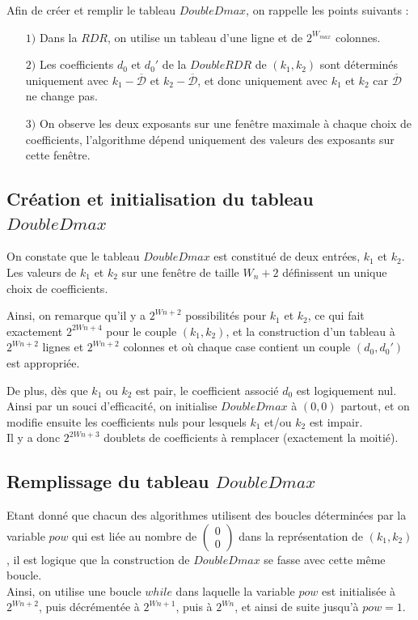 \documentclass[12pt, a4paper]{memoir}
\newcommand{\doublezero}{\begin{pmatrix} 0 \\ 0 \end{pmatrix}}
\newcommand{\dbarre}{\overline{\mathcal{D}}}
\begin{document}
      Afin de créer et remplir le tableau $DoubleDmax$, on rappelle les points suivants :
      \begin{itemize}
      \item [$1)$] Dans la $RDR$, on utilise un tableau d'une ligne et de $2^{W_{max}}$ colonnes.
      \item [$2)$] Les coefficients $d_0$ et $d_0'$ de la $DoubleRDR$ de $(k_1,k_2)$ sont déterminés uniquement avec $k_1 - \dbarre$ et $k_2 - \dbarre$, et donc uniquement
      avec $k_1$ et $k_2$ car $\dbarre$ ne change pas.
      \item [$3)$] On observe les deux exposants sur une fenêtre maximale à chaque choix de coefficients,
      l'algorithme dépend uniquement des valeurs des exposants sur cette fenêtre.
      \end{itemize}

    \subsection{Création et initialisation du tableau $DoubleDmax$}   
   
      On constate que le tableau $DoubleDmax$ est constitué de deux entrées, $k_1$ et $k_2$. \\
      Les valeurs de $k_1$ et $k_2$ sur une fenêtre de taille $W_n + 2$ définissent un unique choix de coefficients.

      Ainsi, on remarque qu'il y a $2^{Wn+2}$ possibilités pour $k_1$ et $k_2$, ce qui fait exactement
      $2^{2Wn+4}$ pour le couple $(k_1,k_2)$, et la construction d'un tableau à $2^{Wn+2}$ lignes et 
      $2^{Wn+2}$ colonnes et où chaque case contient un couple $(d_0,d_0')$ est appropriée.

      De plus, dès que $k_1$ ou $k_2$ est pair, le coefficient associé $d_0$ est logiquement nul.
      Ainsi par un souci d'efficacité, on initialise $DoubleDmax$ à $(0,0)$ partout, et on modifie ensuite les coefficients
      nuls pour lesquels $k_1$ et/ou $k_2$ est impair. \\
      Il y a donc $2^{2Wn+3}$ doublets de coefficients à remplacer (exactement la moitié).
	
    \subsection{Remplissage du tableau $DoubleDmax$}
	
      Etant donné que chacun des algorithmes utilisent des boucles déterminées par la variable $pow$ qui est liée au nombre
      de $\doublezero$ dans la représentation de $(k_1,k_2)$, il est logique que la construction de $DoubleDmax$ se fasse avec cette même boucle. \\
      Ainsi, on utilise une boucle $while$ dans laquelle la variable $pow$ est initialisée à $2^{Wn+2}$, puis décrémentée à $2^{Wn+1}$,
      puis à $2^{Wn}$, et ainsi de suite jusqu'à $pow = 1$.
\end{document}
